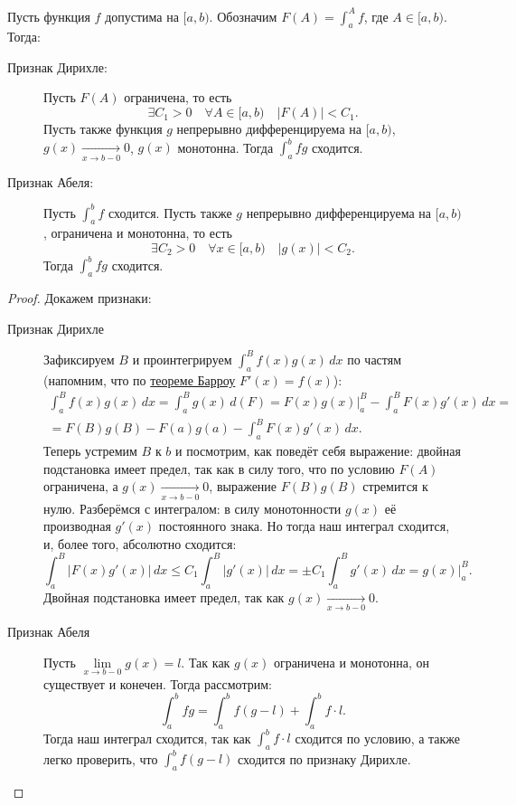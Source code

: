 \begin{theorem}
	Пусть функция \(f\) допустима на \([a, b)\). Обозначим \(F(A) = \int_a^A f\), где \(A \in [a, b)\). Тогда:
	\begin{description}
		\item[Признак Дирихле:] Пусть \(F(A)\) ограничена, то есть \[
		\exists C_1 > 0 \quad \forall A \in [a, b) \quad |F(A)| < C_1.
		\]
		Пусть также функция \(g\) непрерывно дифференцируема на \([a, b)\), \(g(x) \xrightarrow[x \to b-0]{} 0\), \(g(x)\) монотонна. Тогда \(\int_a^b fg\) сходится.
		\item[Признак Абеля:] Пусть \(\int_a^b f\) сходится. Пусть также \(g\) непрерывно дифференцируема на \([a, b)\), ограничена и монотонна, то есть \[
		\exists C_2 > 0 \quad \forall x \in [a, b) \quad |g(x)| < C_2.
		\]
		Тогда \(\int_a^b fg\) сходится. 
	\end{description} 
\end{theorem}
\begin{proof}
	Докажем признаки:
	\begin{description}
		\item[Признак Дирихле] Зафиксируем \(B\) и проинтегрируем \(\displaystyle \int_a^B f(x)g(x) \, dx\) по частям (напомним, что по \hyperlink{t8}{теореме Барроу} \(F'(x) = f(x)\)):
		\begin{multline*}
			\int_a^B f(x)g(x) \, dx = \int_a^B g(x) \, d(F) = F(x)g(x) \bigg|_a^B -\int_a^B F(x)g'(x) \, dx = \\
			= F(B)g(B) - F(a)g(a) - \int_a^B F(x)g'(x) \, dx.
		\end{multline*}
		Теперь устремим \(B\) к \(b\) и посмотрим, как поведёт себя выражение: двойная подстановка имеет предел, так как в силу того, что по условию \(F(A)\) ограничена, а \(g(x) \xrightarrow[x \to b-0]{} 0\), выражение \(F(B)g(B)\) стремится к нулю. Разберёмся с интегралом: в силу монотонности \(g(x)\) её производная \(g'(x)\) постоянного знака. Но тогда наш интеграл сходится, и, более того, абсолютно сходится: \[
		\int_a^B |F(x)g'(x)| \, dx \leqslant C_1 \int_a^B |g'(x)| \, dx = \pm C_1 \int_a^B g'(x) \, dx = g(x) \bigg|_a^B.
		\]
		Двойная подстановка имеет предел, так как \(g(x) \xrightarrow[x \to b-0]{} 0\).
		\item[Признак Абеля] Пусть \(\lim\limits_{x \to b-0} g(x) = l\). Так как \(g(x)\) ограничена и монотонна, он существует и конечен. Тогда рассмотрим: \[
		\int_a^b fg = \int_a^b f(g - l) + \int_a^b f \cdot l.
		\]
		Тогда наш интеграл сходится, так как \(\int_a^b f \cdot l\) сходится по условию, а также легко проверить, что \(\int_a^b f(g - l)\) сходится по признаку Дирихле.
	\end{description}
\end{proof}


